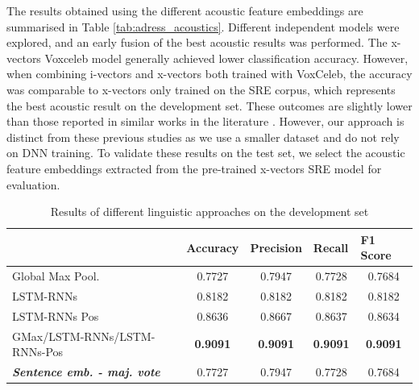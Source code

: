 The results obtained using the different acoustic feature embeddings are summarised in Table \ref{tab:adress_acoustics}. Different independent models were explored, and an early fusion of the best acoustic results was performed. The x-vectors Voxceleb model generally achieved lower classification accuracy. However, when combining i-vectors and x-vectors both trained with VoxCeleb, the accuracy was comparable to x-vectors only trained on the SRE corpus, which represents the best acoustic result on the development set. These outcomes are slightly lower than those reported in similar works in the literature \cite{warnita18_interspeech,zargarbashi2019multi}. However, our approach is distinct from these previous studies as we use a smaller dataset and do not rely on \ac{DNN} training. To validate these results on the test set, we select the acoustic feature embeddings extracted from the pre-trained x-vectors SRE model for evaluation.
\begin{table}[t]
  \begin{tabular}{lcccc}
  \hline
& \multicolumn{1}{l}{\textbf{Accuracy}} & \multicolumn{1}{l}{\textbf{Precision}} & \multicolumn{1}{l}{\textbf{Recall}} & \multicolumn{1}{l}{\textbf{F1 Score}} \\ \hline
  Global Max Pool. & 0.7727                               & 0.7947                                & 0.7728                             & 0.7684                               \\
  LSTM-RNNs        & 0.8182                               & 0.8182                                & 0.8182                             & 0.8182                               \\
  LSTM-RNNs Pos    & 0.8636                               & 0.8667                                & 0.8637                             & 0.8634                               \\
  GMax/LSTM-RNNs/LSTM-RNNs-Pos                   & \textbf{0.9091}                               & \textbf{0.9091}                                & \textbf{0.9091}                             & \textbf{0.9091}  \\  
  \textit{\textbf{Sentence emb. - maj. vote}}                    & 0.7727                               &0.7947                & 0.7728                           & 0.7684
  \\ \hline
  \end{tabular}
  \caption{Results of different linguistic approaches on the development set}
  \label{tab:res_dev_ling}
  \end{table}

